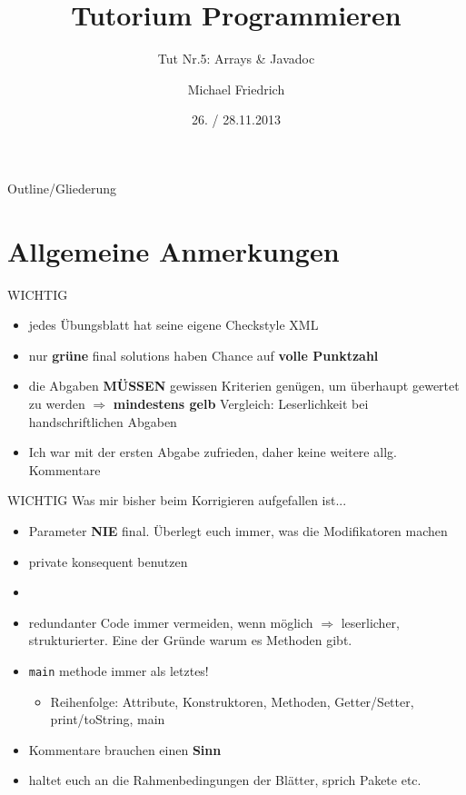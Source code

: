 \documentclass[18pt]{beamer}
\title[Prog Tut Nr. 5]{Tutorium Programmieren}
\subtitle{Tut Nr.5: Arrays & Javadoc}
\author{Michael Friedrich}
\date{26. / 28.11.2013}
\institute{Institut f\"ur theoretische Informatik}
\begin{document}

\begin{frame}
	\titlepage
\end{frame}

\begin{frame}{Outline/Gliederung}
	\tableofcontents
\end{frame}

\section{Allgemeine Anmerkungen}
\begin{frame}[fragile]{WICHTIG}
\begin{itemize}
\item jedes Übungsblatt hat seine eigene Checkstyle XML
\item nur \textbf{grüne} final solutions haben Chance auf \textbf{volle Punktzahl}
\item die Abgaben \textbf{MÜSSEN} gewissen Kriterien genügen, um überhaupt gewertet zu werden \newline
$\Rightarrow$ \textbf{mindestens gelb} \newline
Vergleich: Leserlichkeit bei handschriftlichen Abgaben 
\item Ich war mit der ersten Abgabe zufrieden, daher keine weitere allg. Kommentare
\end{itemize}
\end{frame}

\begin{frame}[fragile]{WICHTIG}
Was mir bisher beim Korrigieren aufgefallen ist...
\begin{itemize}
\item Parameter \textbf{NIE} final. Überlegt euch immer, was die Modifikatoren machen
\item private konsequent benutzen
\item {}
\item redundanter Code immer vermeiden, wenn möglich \newline
$\Rightarrow$ leserlicher, strukturierter. Eine der Gründe warum es Methoden gibt.
\item \lstinline{main} methode immer als letztes!
\begin{itemize}
	\item Reihenfolge: Attribute, Konstruktoren, Methoden, Getter/Setter, print/toString, main
\end{itemize}
\item Kommentare brauchen einen \textbf{Sinn} 
\item haltet euch an die Rahmenbedingungen der Blätter, sprich Pakete etc.
\end{itemize}
\end{frame}
\end{document}
